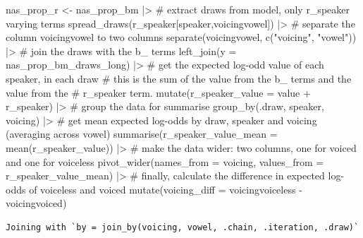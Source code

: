 \documentclass[
  authoryear,
  preprint,
  3p]{elsarticle}
\newenvironment{Shaded}{\begin{snugshade}}{\end{snugshade}}
\newcommand{\AttributeTok}[1]{\textcolor[rgb]{0.40,0.45,0.13}{#1}}
\newcommand{\CommentTok}[1]{\textcolor[rgb]{0.37,0.37,0.37}{#1}}
\newcommand{\FunctionTok}[1]{\textcolor[rgb]{0.28,0.35,0.67}{#1}}
\newcommand{\NormalTok}[1]{\textcolor[rgb]{0.00,0.23,0.31}{#1}}
\newcommand{\OtherTok}[1]{\textcolor[rgb]{0.00,0.23,0.31}{#1}}
\newcommand{\SpecialCharTok}[1]{\textcolor[rgb]{0.37,0.37,0.37}{#1}}
\newcommand{\StringTok}[1]{\textcolor[rgb]{0.13,0.47,0.30}{#1}}
\begin{document}
\begin{Shaded}
\begin{Highlighting}[]
\NormalTok{nas\_prop\_r }\OtherTok{\textless{}{-}}\NormalTok{ nas\_prop\_bm }\SpecialCharTok{|\textgreater{}} 
  \CommentTok{\# extract draws from model, only \textasciigrave{}r\_speaker\textasciigrave{} varying terms}
  \FunctionTok{spread\_draws}\NormalTok{(r\_speaker[speaker,voicingvowel]) }\SpecialCharTok{|\textgreater{}} 
  \CommentTok{\# separate the column voicingvowel to two columns}
  \FunctionTok{separate}\NormalTok{(voicingvowel, }\FunctionTok{c}\NormalTok{(}\StringTok{"voicing"}\NormalTok{, }\StringTok{"vowel"}\NormalTok{)) }\SpecialCharTok{|\textgreater{}} 
  \CommentTok{\# join the draws with the \textasciigrave{}b\_\textasciigrave{} terms}
  \FunctionTok{left\_join}\NormalTok{(}\AttributeTok{y =}\NormalTok{ nas\_prop\_bm\_draws\_long) }\SpecialCharTok{|\textgreater{}} 
  \CommentTok{\# get the expected log{-}odd value of each speaker, in each draw}
  \CommentTok{\# this is the sum of the \textasciigrave{}value\textasciigrave{} from the b\_ terms and the value from the}
  \CommentTok{\# r\_speaker term.}
  \FunctionTok{mutate}\NormalTok{(}\AttributeTok{r\_speaker\_value =}\NormalTok{ value }\SpecialCharTok{+}\NormalTok{ r\_speaker) }\SpecialCharTok{|\textgreater{}} 
  \CommentTok{\# group the data for summarise}
  \FunctionTok{group\_by}\NormalTok{(.draw, speaker, voicing) }\SpecialCharTok{|\textgreater{}} 
  \CommentTok{\# get mean expected log{-}odds by draw, speaker and voicing (averaging across vowel)}
  \FunctionTok{summarise}\NormalTok{(}\AttributeTok{r\_speaker\_value\_mean =} \FunctionTok{mean}\NormalTok{(r\_speaker\_value)) }\SpecialCharTok{|\textgreater{}} 
  \CommentTok{\# make the data wider: two columns, one for voiced and one for voiceless}
  \FunctionTok{pivot\_wider}\NormalTok{(}\AttributeTok{names\_from =}\NormalTok{ voicing, }\AttributeTok{values\_from =}\NormalTok{ r\_speaker\_value\_mean) }\SpecialCharTok{|\textgreater{}} 
  \CommentTok{\# finally, calculate the difference in expected log{-}odds of voiceless and voiced}
  \FunctionTok{mutate}\NormalTok{(}\AttributeTok{voicing\_diff =}\NormalTok{ voicingvoiceless }\SpecialCharTok{{-}}\NormalTok{ voicingvoiced)}
\end{Highlighting}
\end{Shaded}

\begin{verbatim}
Joining with `by = join_by(voicing, vowel, .chain, .iteration, .draw)`
\end{verbatim}
\end{document}
